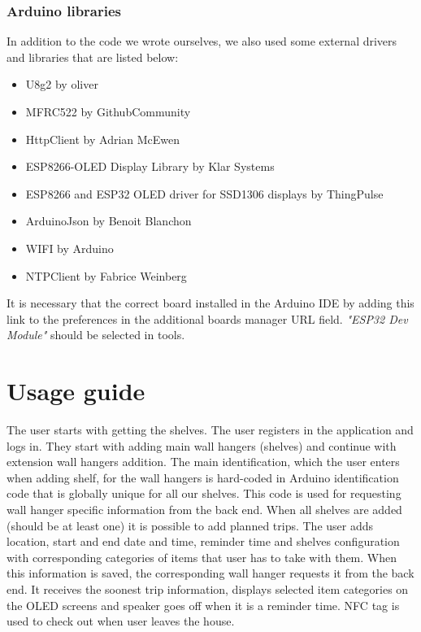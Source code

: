 \documentclass{article}
\begin{document}
\subsubsection{Arduino libraries}
In addition to the code we wrote ourselves, we also used some external drivers and libraries that are listed below: 
\begin{itemize}
    \item U8g2 by oliver \cite{u8g2} 
    \item MFRC522 by GithubCommunity \cite{MFRC522}
    \item HttpClient by Adrian McEwen \cite{httpclient}
    \item ESP8266-OLED Display Library by Klar Systems \cite{esp-oled}
    \item ESP8266 and ESP32 OLED driver for SSD1306 displays by ThingPulse \cite{oled-driver}
    \item ArduinoJson by Benoit Blanchon \cite{arduino-json}
    \item WIFI by Arduino \cite{wifi}
    \item NTPClient by Fabrice Weinberg \cite{ntpclient}
\end{itemize}
It is necessary that the correct board installed in the Arduino IDE by adding this link \href{https://dl.espressif.com/dl/package_esp32_index.json}{} to the preferences in the additional boards manager URL field. \textit{"ESP32 Dev Module"} should be selected in tools.

\section{Usage guide}
The user starts with getting the shelves. The user registers in the application and logs in. They start with adding main wall hangers (shelves) and continue with extension wall hangers addition. The main identification, which the user enters when adding shelf, for the wall hangers is hard-coded in Arduino identification code that is globally unique for all our shelves. This code is used for requesting wall hanger specific information from the back end. When all shelves are added (should be at least one) it is possible to add planned trips. The user adds location, start and end date and time, reminder time and shelves configuration with corresponding categories of items that user has to take with them. When this information is saved, the corresponding wall hanger requests it from the back end. It receives the soonest trip information, displays selected item categories on the OLED screens and speaker goes off when it is a reminder time. NFC tag is used to check out when user leaves the house.
\end{document}

